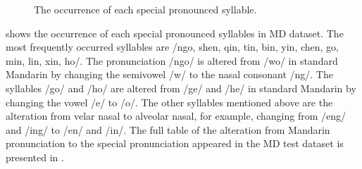 \begin{figure}[ht!]
\caption{The occurrence of each special pronounced syllable.}
\label{fig:ch4:occurrence_special}
\end{figure}

 shows the occurrence of each special pronounced syllables in \gls{MD} dataset. The most frequently occurred syllables are /ngo, shen, qin, tin, bin, yin, chen, go, min, lin, xin, ho/. The pronunciation /ngo/ is altered from /wo/ in standard Mandarin by changing the semivowel /w/ to the nasal consonant /ng/. The syllables /go/ and /ho/ are altered from /ge/ and /he/ in standard Mandarin by changing the vowel /e/ to /o/. The other syllables mentioned above are the alteration from velar nasal to alveolar nasal, for example, changing from /eng/ and /ing/ to /en/ and /in/. The full table of the alteration from Mandarin pronunciation to the special pronunciation appeared in the \gls{MD} test dataset is presented in .


